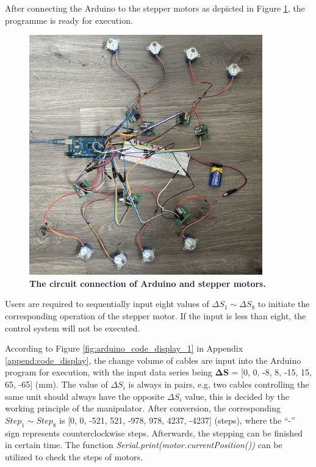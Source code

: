 \vspace{-15mm}

After connecting the Arduino to the stepper motors as depicted in Figure \ref{fig:circuit_connection}, 
the programme is ready for execution.
\begin{figure}[H] %
    \centering 
    \captionsetup{labelsep=colon}
    \includegraphics[width=0.9\textwidth]{Image/Result/circuit_connection.jpg} 
    \caption[The circuit connection of Arduino and stepper motors]
    {\centering \textbf{The circuit connection of Arduino and stepper motors.}}
    \label{fig:circuit_connection}
\end{figure}
\vspace{-5mm}
Users are required to sequentially input eight values of $\Delta S_1 \sim \Delta S_8$ to initiate 
the corresponding operation of the stepper motor. If the input is less than eight, the control system will 
not be executed. 

According to Figure \ref{fig:arduino_code_display_1} in Appendix \ref{append:code_display}, the change volume 
of cables are input into the Arduino program for execution, with the input data series being $\boldsymbol{\Delta S}$ 
= [0, 0, -8, 8, -15, 15, 65, -65] (mm). The value of $\Delta S_i$ is always in pairs, e.g, two cables controlling 
the same unit should always have the opposite $\Delta S_i$ value, this is decided by the working principle of the 
manipulator. After conversion, the corresponding $Step_1 \sim Step_8$ is [0, 0, -521, 521, -978, 978, 4237, -4237] 
(steps), where the “-” sign represents counterclockwise steps. Afterwards, the stepping can be finished in certain 
time. The function \emph{Serial.print(motor.currentPosition())} can be utilized to check the steps of motors.

